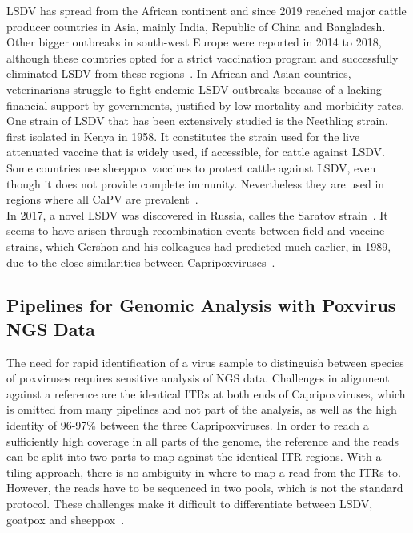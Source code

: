 \ac{LSDV} has spread from the African continent and since 2019 reached major cattle producer countries in Asia, mainly India, Republic of China and Bangladesh. Other bigger outbreaks in south-west Europe were reported in 2014 to 2018, although these countries opted for a strict vaccination program and successfully eliminated \ac{LSDV} from these regions~\cite{prevention2017control}. In African and Asian countries, veterinarians struggle to fight endemic \ac{LSDV} outbreaks because of a lacking financial support by governments, justified by low mortality and morbidity rates. \\
One strain of \ac{LSDV} that has been extensively studied is the Neethling strain, first isolated in Kenya in 1958. It constitutes the strain used for the live attenuated vaccine that is widely used, if accessible, for cattle against \ac{LSDV}. Some countries use sheeppox vaccines to protect cattle against \ac{LSDV}, even though it does not provide complete immunity. Nevertheless they are used in regions where all \acs{CaPV} are prevalent~\cite{brenner2009appearance}. \\
In 2017, a novel \ac{LSDV} was discovered in Russia, calles the Saratov strain~\cite{sprygin2018analysis}. It seems to have arisen through recombination events between field and vaccine strains, which Gershon and his colleagues had predicted much earlier, in 1989, due to the close similarities between Capripoxviruses~\cite{gershon1989poxvirus}. 

\subsection{Pipelines for Genomic Analysis with Poxvirus NGS Data}\label{sec:2-pox-pipelines}
The need for rapid identification of a virus sample to distinguish between species of poxviruses requires sensitive analysis of \ac{NGS} data. Challenges in alignment against a reference are the identical \acp{ITR} at both ends of Capripoxviruses, which is omitted from many pipelines and not part of the analysis, as well as the high identity of 96-97\% between the three Capripoxviruses. In order to reach a sufficiently high coverage in all parts of the genome, the reference and the reads can be split into two parts to map against the identical \ac{ITR} regions. With a tiling approach, there is no ambiguity in where to map a read from the \acp{ITR} to. However, the reads have to be sequenced in two pools, which is not the standard protocol. These challenges make it difficult to differentiate between \ac{LSDV}, goatpox and sheeppox~\cite{tulman2001genome}.

